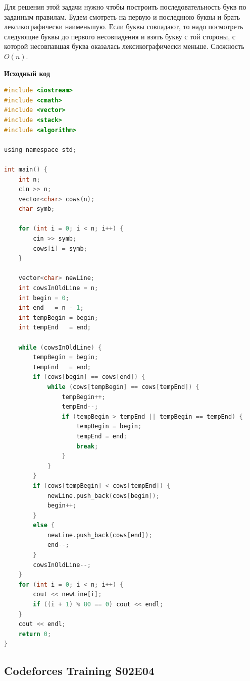 \documentclass[a4paper,12pt]{article}
\begin{document}
Для решения этой задачи нужно чтобы построить последовательность букв по заданным правилам. Будем смотреть на первую и последнюю буквы и брать лексикографически наименьшую. Если буквы совпадают, то надо посмотреть следующие буквы до первого несовпадения и взять букву с той стороны, с которой несовпавшая буква оказалась лексикографически меньше. Сложность $O(n)$.


\newpage
\textbf{{\large Исходный код}} \\
\begin{lstlisting}[language=C]
#include <iostream>
#include <cmath>
#include <vector>
#include <stack>
#include <algorithm>

using namespace std;

int main() {
    int n;
    cin >> n;
    vector<char> cows(n);
    char symb;
    
    for (int i = 0; i < n; i++) {
        cin >> symb;
        cows[i] = symb;
    }
    
    vector<char> newLine;
    int cowsInOldLine = n;
    int begin = 0;
    int end   = n - 1;
    int tempBegin = begin;
    int tempEnd   = end;
    
    while (cowsInOldLine) {
        tempBegin = begin;
        tempEnd   = end;
        if (cows[begin] == cows[end]) {
            while (cows[tempBegin] == cows[tempEnd]) {
                tempBegin++;
                tempEnd--;
                if (tempBegin > tempEnd || tempBegin == tempEnd) {
                    tempBegin = begin;
                    tempEnd = end;
                    break;
                }
            }
        }
        if (cows[tempBegin] < cows[tempEnd]) {
            newLine.push_back(cows[begin]);
            begin++;
        }
        else {
            newLine.push_back(cows[end]);
            end--;
        }
        cowsInOldLine--;
    }
    for (int i = 0; i < n; i++) {
        cout << newLine[i];
        if ((i + 1) % 80 == 0) cout << endl;
    }
    cout << endl;
    return 0;
}
\end{lstlisting}



%
%
\newpage
\subsection{Codeforces Training S02E04}
\end{document}
